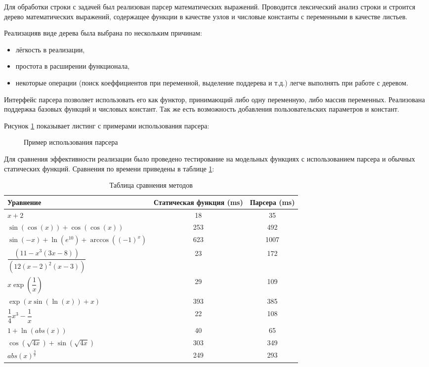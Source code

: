 Для обработки строки с задачей был реализован парсер математических выражений. Проводится лексический анализ строки и строится дерево
математических выражений, содержащее функции в качестве узлов и числовые константы с переменными в качестве листьев.

Реализацияв виде дерева была выбрана по нескольким причинам:

\begin{itemize}
    \item лёгкость в реализации,
    \item простота в расширении функционала,
    \item некоторые операции (поиск коеффициентов при переменной, выделение поддерева и т.д.) легче выполнять при работе с деревом.
\end{itemize}

Интерфейс парсера позволяет использовать его как функтор, принимающий либо одну переменную, либо массив переменных. Реализована поддержка
базовых функций и числовых констант. Так же есть возможность добавления пользовательских параметров и констант.

Рисунок \ref{src:FuncMaker} показывает листинг с примерами использования парсера:

\begin{figure}
    
    \caption{Пример использования парсера}
    \label{src:FuncMaker}
\end{figure}

Для сравнения эффективности реализации было проведено тестирование на модельных функциях с использованием парсера и обычных
статических функций. Сравнения по времени приведены в таблице \ref{tab:Banchmark}:

\begin{table}    
    \caption{Таблица сравнения методов}
    \begin{tabularx}{\textwidth}{|X|c|c|}
    \hline
    Уравнение & Статическая функция (ms) & Парсера (ms)\\
    \hline
    $x + 2$ & 18 & 35\\
    \hline
    $\sin(\cos(x)) + \cos(\cos(x))$ & 253 & 492\\
    \hline
    $\sin(-x) + \ln(e^{10}) + \arccos((-1)^x)$ & 623 & 1007\\
    \hline
    $\dfrac{(11 - x^3 (3x - 8))}{(12(x - 2)^2 (x - 3))}$ & 23 & 172\\
    \hline
    $x\exp(\dfrac{1}{x})$ & 29 & 109\\
    \hline
    $\exp(x\sin(\ln(x)) + x)$ & 393 & 385\\
    \hline
    $\dfrac{1}{4}x^3 - \dfrac{1}{x}$ & 22 & 108\\
    \hline
    $1 + \ln(abs(x))$ & 40 & 65\\
    \hline
    $\cos(\sqrt{4x}) + \sin(\sqrt{4x})$ & 303 & 349\\
    \hline
    $abs(x)^\frac{3}{2}$ & 249 & 293\\
    \hline
    \end{tabularx}
    \label{tab:Banchmark}
\end{table}


